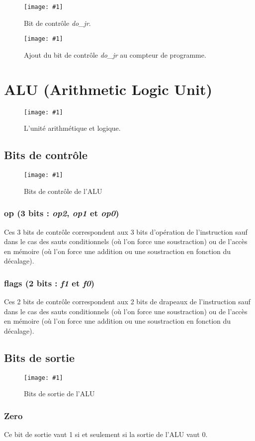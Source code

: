 \documentclass[twoside, 12pt, a4paper]{article}
\newcommand{\cf}[3]{
    \begin{figure}[!h]
        \centering
        \texttt{[image: \#1]}
    \caption{#3}\label{Fig:#1}
    \end{figure}
}
\newcommand{\hcf}[2]{\cf{#1}{.75}{#2}}
\begin{document}
        \hcf{do_jr.png}{Bit de contrôle \textit{do\_jr}.}

        \hcf{clock_jr.png}{Ajout du bit de contrôle \textit{do\_jr} au compteur de programme.}

        \newpage
        
\section{ALU (Arithmetic Logic Unit)}

    \hcf{ALU.png}{L'unité arithmétique et logique.}

    \subsection{Bits de contrôle}

    \hcf{ctrl_ALU.png}{Bits de contrôle de l'ALU}
    
        \subsubsection{op (3 bits : \textit{op2}, \textit{op1} et \textit{op0})}
        Ces 3 bits de contrôle correspondent aux 3 bits d'opération de l'instruction sauf dans le cas des sauts conditionnels (où l'on force une soustraction) ou de l'accès en mémoire (où l'on force une addition ou une soustraction en fonction du décalage).
        
        \subsubsection{flags (2 bits : \textit{f1} et \textit{f0})}
        Ces 2 bits de contrôle correspondent aux 2 bits de drapeaux de l'instruction sauf dans le cas des sauts conditionnels (où l'on force une soustraction) ou de l'accès en mémoire (où l'on force une addition ou une soustraction en fonction du décalage).
        
    \subsection{Bits de sortie}

    \hcf{out_ALU.png}{Bits de sortie de l'ALU}
    
        \subsubsection{Zero}
        Ce bit de sortie vaut 1 si et seulement si la sortie de l'ALU vaut 0.
\end{document}

